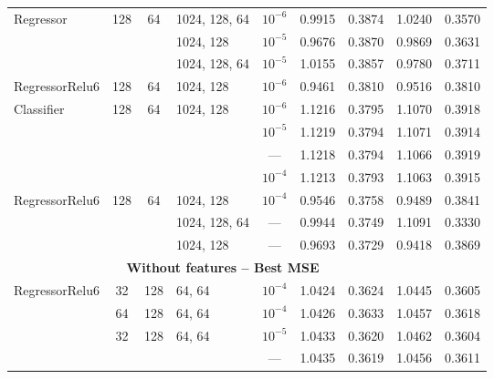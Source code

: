 \begin{table}
\begin{tabular}{lcclccccc}
Regressor & 128 & 64 & 1024, 128, 64 & $10^{-6}$   &  0.9915 &      0.3874 &   1.0240 &        0.3570 \\
           &     &    & 1024, 128 & $10^{-5}$   &  0.9676 &      0.3870 &   0.9869 &        0.3631 \\
           &     &    & 1024, 128, 64 & $10^{-5}$   &  1.0155 &      0.3857 &   0.9780 &        0.3711 \\
RegressorRelu6 & 128 & 64 & 1024, 128 & $10^{-6}$   &  0.9461 &      0.3810 &   0.9516 &        0.3810 \\
Classifier & 128 & 64 & 1024, 128 & $10^{-6}$   &  1.1216 &      0.3795 &   1.1070 &        0.3918 \\
           &     &    &                                 & $10^{-5}$   &  1.1219 &      0.3794 &   1.1071 &        0.3914 \\
           &     &    &                                 & ---   &  1.1218 &      0.3794 &   1.1066 &        0.3919 \\
           &     &    &                                 & $10^{-4}$   &  1.1213 &      0.3793 &   1.1063 &        0.3915 \\
RegressorRelu6 & 128 & 64 & 1024, 128 & $10^{-4}$   &  0.9546 &      0.3758 &   0.9489 &        0.3841 \\
           &     &    & 1024, 128, 64 & ---   &  0.9944 &      0.3749 &   1.1091 &        0.3330 \\
           &     &    & 1024, 128 & ---   &  0.9693 &      0.3729 &   0.9418 &        0.3869 \\
\midrule
\multicolumn{8}{c}{\textbf{Without features -- Best MSE}}\\\addlinespace
RegressorRelu6 & 32 & 128 & 64, 64 & $10^{-4}$ &  1.0424 &      0.3624 &   1.0445 &        0.3605 \\
                & 64 & 128 & 64, 64 & $10^{-4}$ &  1.0426 &      0.3633 &   1.0457 &        0.3618 \\
                & 32 & 128 & 64, 64 & $10^{-5}$ &  1.0433 &      0.3620 &   1.0462 &        0.3604 \\
                &    &     &        & --- &  1.0435 &      0.3619 &   1.0456 &        0.3611 \\
%      

\end{tabular}
\end{table}
